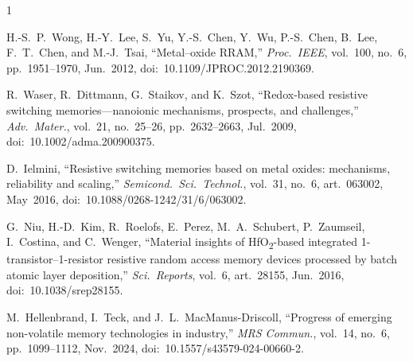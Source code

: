 \documentclass[lettersize,journal]{IEEEtran}
\begin{document}
\begin{thebibliography}{1}


H.-S.\ P.\ Wong, H.-Y.\ Lee, S.\ Yu, Y.-S.\ Chen, Y.\ Wu, P.-S.\ Chen, B.\ Lee, F.\ T.\ Chen, and M.-J.\ Tsai, ``Metal--oxide RRAM,'' \textit{Proc.\ IEEE}, vol.\ 100, no.\ 6, pp.\ 1951--1970, Jun.\ 2012, doi:~10.1109/JPROC.2012.2190369.

R.\ Waser, R.\ Dittmann, G.\ Staikov, and K.\ Szot, ``Redox-based resistive switching memories---nanoionic mechanisms, prospects, and challenges,'' \textit{Adv.\ Mater.}, vol.\ 21, no.\ 25--26, pp.\ 2632--2663, Jul.\ 2009, doi:~10.1002/adma.200900375.

D.\ Ielmini, ``Resistive switching memories based on metal oxides: mechanisms, reliability and scaling,'' \textit{Semicond.\ Sci.\ Technol.}, vol.\ 31, no.\ 6, art.\ 063002, May~2016, doi:~10.1088/0268-1242/31/6/063002.

G.\ Niu, H.-D.\ Kim, R.\ Roelofs, E.\ Perez, M.\ A.\ Schubert, P.\ Zaumseil, I.\ Costina, and C.\ Wenger, ``Material insights of HfO\textsubscript{2}-based integrated 1-transistor--1-resistor resistive random access memory devices processed by batch atomic layer deposition,'' \textit{Sci.\ Reports}, vol.\ 6, art.\ 28155, Jun.\ 2016, doi:~10.1038/srep28155.

M.\ Hellenbrand, I.\ Teck, and J.\ L.\ MacManus-Driscoll, ``Progress of emerging non-volatile memory technologies in industry,'' \textit{MRS Commun.}, vol.\ 14, no.\ 6, pp.\ 1099--1112, Nov.\ 2024, doi:~10.1557/s43579-024-00660-2.

\end{thebibliography}
\end{document}

